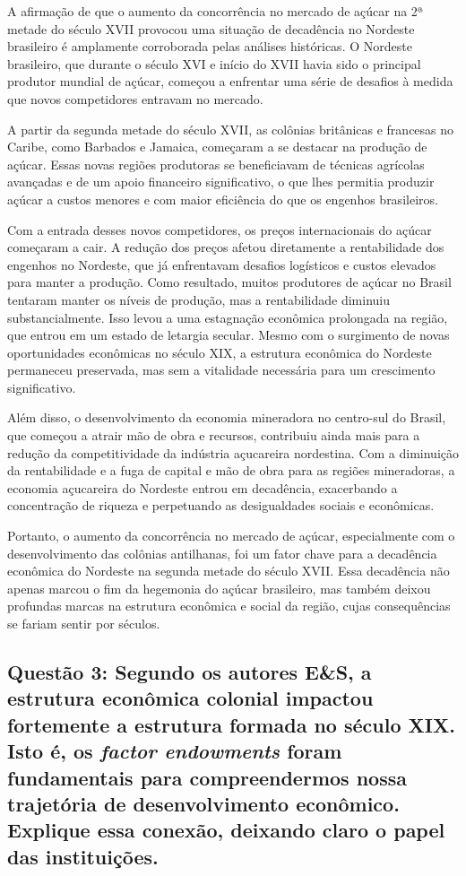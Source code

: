 \documentclass[a4paper,12pt]{article}[abntex2]
\begin{document}
A afirmação de que o aumento da concorrência no mercado de açúcar na 2ª metade do século XVII provocou uma situação de decadência no Nordeste brasileiro é amplamente corroborada pelas análises históricas. O Nordeste brasileiro, que durante o século XVI e início do XVII havia sido o principal produtor mundial de açúcar, começou a enfrentar uma série de desafios à medida que novos competidores entravam no mercado.

A partir da segunda metade do século XVII, as colônias britânicas e francesas no Caribe, como Barbados e Jamaica, começaram a se destacar na produção de açúcar. Essas novas regiões produtoras se beneficiavam de técnicas agrícolas avançadas e de um apoio financeiro significativo, o que lhes permitia produzir açúcar a custos menores e com maior eficiência do que os engenhos brasileiros.

Com a entrada desses novos competidores, os preços internacionais do açúcar começaram a cair. A redução dos preços afetou diretamente a rentabilidade dos engenhos no Nordeste, que já enfrentavam desafios logísticos e custos elevados para manter a produção. Como resultado, muitos produtores de açúcar no Brasil tentaram manter os níveis de produção, mas a rentabilidade diminuiu substancialmente. Isso levou a uma estagnação econômica prolongada na região, que entrou em um estado de letargia secular. Mesmo com o surgimento de novas oportunidades econômicas no século XIX, a estrutura econômica do Nordeste permaneceu preservada, mas sem a vitalidade necessária para um crescimento significativo.

Além disso, o desenvolvimento da economia mineradora no centro-sul do Brasil, que começou a atrair mão de obra e recursos, contribuiu ainda mais para a redução da competitividade da indústria açucareira nordestina. Com a diminuição da rentabilidade e a fuga de capital e mão de obra para as regiões mineradoras, a economia açucareira do Nordeste entrou em decadência, exacerbando a concentração de riqueza e perpetuando as desigualdades sociais e econômicas.

Portanto, o aumento da concorrência no mercado de açúcar, especialmente com o desenvolvimento das colônias antilhanas, foi um fator chave para a decadência econômica do Nordeste na segunda metade do século XVII. Essa decadência não apenas marcou o fim da hegemonia do açúcar brasileiro, mas também deixou profundas marcas na estrutura econômica e social da região, cujas consequências se fariam sentir por séculos.

\subsection{\textbf{Questão 3: Segundo os autores E\&S, a estrutura econômica colonial impactou fortemente a estrutura formada no século XIX. Isto é, os \textit{factor endowments} foram fundamentais para compreendermos nossa trajetória de desenvolvimento econômico. Explique essa conexão, deixando claro o papel das instituições.}}
\end{document}
